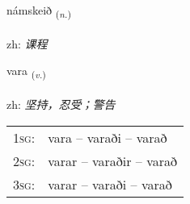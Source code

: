 \documentclass[frontgrid, backgrid]{flacards}\usepackage[]{graphicx}\usepackage[]{color}
\begin{document}
\renewcommand{\flhead}{\vskip5pt \fboxsep=0pt {\small\bfseries\footnotesize Nafnorð | 名词}}
\renewcommand{\fcfoot}{\vskip5pt \fboxsep=0pt \hspace{2pt}{\small\bfseries\footnotesize 2K}}

\renewcommand{\blhead}{\vskip5pt {\small\bfseries\footnotesize Nafnorð | 名词 }}
\renewcommand{\bcfoot}{\vskip5pt \hspace{2pt}{\small\bfseries\footnotesize 2K}}


{námskeið \small{\textsubscript{(\textit{n.})}} \\[1ex] %
\textphonetic{[naumsceið]} \\
zh: \emph{课程} \\  [2ex]
\renewcommand*{\arraystretch}{0.8}
}

\renewcommand{\flhead}{\vskip5pt \fboxsep=0pt {\small\bfseries\footnotesize Sagnorð | 动词}}
\renewcommand{\fcfoot}{\vskip5pt \fboxsep=0pt \hspace{2pt}{\small\bfseries\footnotesize 2K}}

\renewcommand{\blhead}{\vskip5pt {\small\bfseries\footnotesize Sagnorð | 动词 }}
\renewcommand{\bcfoot}{\vskip5pt \hspace{2pt}{\small\bfseries\footnotesize 2K}}


{vara \small{\textsubscript{(\textit{v.})}} \\[1ex] %
\textphonetic{[vaːra]} \\
zh: \emph{坚持，忍受；警告} \\  [2ex]
\renewcommand*{\arraystretch}{0.8}
\begin{tabular}{p{1cm}l}
\textsc{1sg}: & vara -- varaði -- varað \\ 
\textsc{2sg}: & varar -- varaðir -- varað \\ 
\textsc{3sg}: & varar -- varaði -- varað \\ 
\end{tabular}
}
\end{document}
